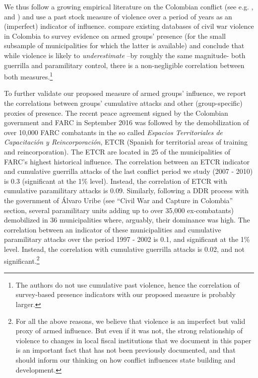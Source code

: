 We thus follow a growing empirical literature on the Colombian conflict (see e.g. \citet{acemoglurobinson13a}, \citet{fergussonetal2016} and \citet{fergussonetal2018}) and use a past stock measure of violence over a period of years as an (imperfect) indicator of influence. \citet{arjonaotalora11a} compare existing databases of civil war violence in Colombia to survey evidence on armed groups' presence (for the small subsample of municipalities for which the latter is available) and conclude that while violence is likely to {\it underestimate} --by roughly the same magnitude- both guerrilla and paramilitary control, there is a non-negligible correlation between both measures.\footnote{The authors do not use cumulative past violence, hence the correlation of survey-based presence indicators with our proposed measure is probably larger.} 

To further validate our proposed measure of armed groups' influence, we report the correlations between groups' cumulative attacks and other (group-specific) proxies of presence. The recent peace agreement signed by the Colombian government and FARC in September 2016 was followed by the demobilization of over 10,000 FARC combatants in the so called {\it Espacios Territoriales de Capacitaci\'on y Reincorporaci\'on}, ETCR (Spanish for territorial areas of training and reincorporation). The ETCR are located in 25 of the municipalities of FARC's highest historical influence. The correlation between an ETCR indicator and cumulative guerrilla attacks of the last conflict period we study (2007 - 2010) is 0.3 (significant at the 1\% level). Instead, the correlation of ETCR with cumulative paramilitary attacks is 0.09. Similarly, following a DDR process with the government of \'{A}lvaro Uribe (see ``Civil War and Capture in Colombia'' section, several paramilitary units adding up to over 35,000 ex-combatants) demobilized in 36 municipalities where, arguably, their dominance was high. The correlation between an indicator of these municipalities and cumulative paramilitary attacks over the period 1997 - 2002 is 0.1, and significant at the 1\% level. Instead, the correlation with cumulative guerrilla attacks is 0.02, and not significant.\footnote{For all the above reasons, we believe that violence is an imperfect but valid proxy of armed influence. But even if it was not, the strong relationship of violence to changes in local fiscal institutions that we document in this paper is an important fact that has not been previously documented, and that should inform our thinking on how conflict influences state building and development.}


